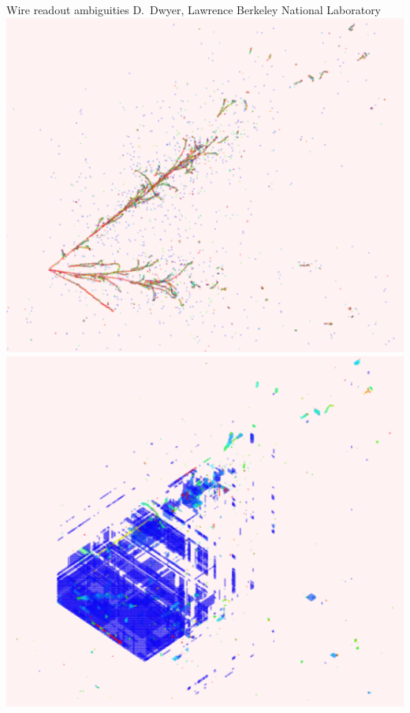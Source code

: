 \documentclass[]{beamer}
\begin{document}
\begin{frame}{Wire readout ambiguities}{}
	{\tiny D.\ Dwyer, Lawrence Berkeley National Laboratory}\\
	\centering
	\includegraphics[height=.6\textheight]{defence/nuecctru}
	\includegraphics[height=.6\textheight]{defence/nueccamb}
\end{frame}
\end{document}
